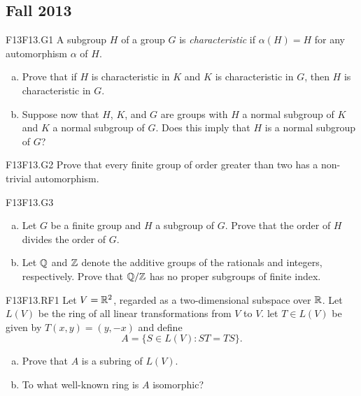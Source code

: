 \documentclass[../AlgebraQualSolutions.tex]{subfiles}
\begin{document}
\subsection{Fall 2013}

\begin{prob}{F13}{F13.G1}
	A subgroup $H$ of a group $G$ is \emph{characteristic} if $\alpha(H) = H$ for any automorphism $\alpha$ of $H$.
	
	\begin{enumerate}[(a)]
		\item Prove that if $H$ is characteristic in $K$ and $K$ is characteristic in $G$, then $H$ is characteristic in $G$.
		\item Suppose now that $H$, $K$, and $G$ are groups with $H$ a normal subgroup of $K$ and $K$ a normal subgroup of $G$. Does this imply that $H$ is a normal subgroup of $G$?
	\end{enumerate}
\end{prob}

\begin{prob}{F13}{F13.G2}
	Prove that every finite group of order greater than two has a non-trivial automorphism.
\end{prob}

\begin{prob}{F13}{F13.G3}

	\begin{enumerate}[(a)]
		\item Let $G$ be a finite group and $H$ a subgroup of $G$. Prove that the order of $H$ divides the order of $G$.
		\item  Let $\mathbb{Q}$ and $\mathbb{Z}$ denote the additive groups of the rationals and integers, respectively. Prove that $\mathbb{Q}/\mathbb{Z}$ has no proper subgroups of finite index.
	\end{enumerate}
\end{prob}

\begin{prob}{F13}{F13.RF1}
	Let $V = \mathbb{R}^2$, regarded as a two-dimensional subspace over $\mathbb{R}$. Let $L(V)$ be the ring of all linear transformations from $V$ to $V$. let $T \in L(V)$ be given by $T(x,y) = (y,-x)$ and define 
		\[A = \{S \in L(V): ST = TS\}. \]
	\begin{enumerate}[(a)]
		\item Prove that $A$ is a subring of $L(V)$.
		\item To what well-known ring is $A$ isomorphic?
	\end{enumerate}
\end{prob}
\end{document}
